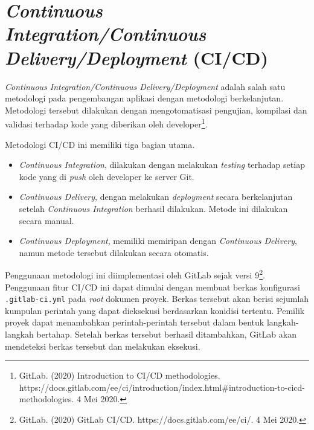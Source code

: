 \section{\textit{Continuous Integration/Continuous Delivery/Deployment} (CI/CD)}

    \textit{Continuous Integration/Continuous Delivery/Deployment} adalah salah
    satu metodologi pada pengembangan aplikasi dengan metodologi
    berkelanjutan. Metodologi tersebut dilakukan dengan mengotomatisasi
    pengujian, kompilasi dan validasi terhadap kode yang diberikan oleh
    developer\footnote{GitLab.  (2020) Introduction to CI/CD methodologies.
    https://docs.gitlab.com/ee/ci/introduction/index.html{\#}introduction-to-cicd-methodologies.
    4 Mei 2020.}.
    
    Metodologi CI/CD ini memiliki tiga bagian
    utama.
    \begin{itemize}
        \item \textit{Continuous Integration}, dilakukan dengan melakukan
        \textit{testing} terhadap setiap kode yang di \textit{push} oleh
        developer ke server Git.
        
        \item \textit{Continuous Delivery}, dengan melakukan \textit{deployment}
        secara berkelanjutan setelah \textit{Continuous Integration} berhasil
        dilakukan. Metode ini dilakukan secara manual.
        
        \item \textit{Continuous Deployment}, memiliki memiripan dengan
        \textit{Continuous Delivery}, namun metode tersebut dilakukan secara
        otomatis.
    \end{itemize}
    
    Penggunaan metodologi ini diimplementasi oleh GitLab sejak versi
    9\footnote{GitLab. (2020) GitLab CI/CD. https://docs.gitlab.com/ee/ci/. 4
    Mei 2020.}.  Penggunaan fitur CI/CD ini dapat dimulai
    dengan membuat berkas konfigurasi \texttt{.gitlab-ci.yml} pada \textit{root}
    dokumen proyek. Berkas tersebut akan berisi sejumlah kumpulan perintah yang
    dapat dieksekusi berdasarkan konidisi tertentu. Pemilik proyek dapat
    menambahkan perintah-perintah tersebut dalam bentuk langkah-langkah
    bertahap. Setelah berkas tersebut berhasil ditambahkan, GitLab akan
    mendeteksi berkas tersebut dan melakukan eksekusi.
    
